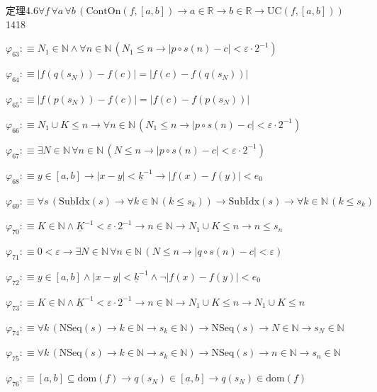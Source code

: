 \begin{fullproof}{定理4.6}{$\forall f\,\forall a\,\forall b\,(\mathrm{ContOn}(f,[a,b]) \to a \in \mathbb{R} \to b \in \mathbb{R} \to \mathrm{UC}(f,[a,b]))$}{1418}
\begin{abbrevlist}
\item $\varphi_{63} :\equiv N_{1} \in \mathbb{N} \land \forall n \in \mathbb{N}\,(N_{1} \leq n \to \lvert p \circ s(n) - c \rvert < \varepsilon \cdot 2^{-1})$
\item $\varphi_{64} :\equiv \lvert f(q(s_{N})) - f(c) \rvert = \lvert f(c) - f(q(s_{N})) \rvert$
\item $\varphi_{65} :\equiv \lvert f(p(s_{N})) - f(c) \rvert = \lvert f(c) - f(p(s_{N})) \rvert$
\item $\varphi_{66} :\equiv N_{1} \cup K \leq n \to \forall n \in \mathbb{N}\,(N_{1} \leq n \to \lvert p \circ s(n) - c \rvert < \varepsilon \cdot 2^{-1})$
\item $\varphi_{67} :\equiv \exists N \in \mathbb{N}\,\forall n \in \mathbb{N}\,(N \leq n \to \lvert p \circ s(n) - c \rvert < \varepsilon \cdot 2^{-1})$
\item $\varphi_{68} :\equiv y \in [a,b] \to \lvert x - y \rvert < \underline{k}^{-1} \to \lvert f(x) - f(y) \rvert < e_{0}$
\item $\varphi_{69} :\equiv \forall s\,(\mathrm{SubIdx}(s) \to \forall k \in \mathbb{N}\,(k \leq s_{k})) \to \mathrm{SubIdx}(s) \to \forall k \in \mathbb{N}\,(k \leq s_{k})$
\item $\varphi_{70} :\equiv K \in \mathbb{N} \land \underline{K}^{-1} < \varepsilon \cdot 2^{-1} \to n \in \mathbb{N} \to N_{1} \cup K \leq n \to n \leq s_{n}$
\item $\varphi_{71} :\equiv 0 < \varepsilon \to \exists N \in \mathbb{N}\,\forall n \in \mathbb{N}\,(N \leq n \to \lvert q \circ s(n) - c \rvert < \varepsilon)$
\item $\varphi_{72} :\equiv y \in [a,b] \land \lvert x - y \rvert < \underline{k}^{-1} \land \neg \lvert f(x) - f(y) \rvert < e_{0}$
\item $\varphi_{73} :\equiv K \in \mathbb{N} \land \underline{K}^{-1} < \varepsilon \cdot 2^{-1} \to n \in \mathbb{N} \to N_{1} \cup K \leq n \to N_{1} \cup K \leq n$
\item $\varphi_{74} :\equiv \forall k\,(\mathrm{NSeq}(s) \to k \in \mathbb{N} \to s_{k} \in \mathbb{N}) \to \mathrm{NSeq}(s) \to N \in \mathbb{N} \to s_{N} \in \mathbb{N}$
\item $\varphi_{75} :\equiv \forall k\,(\mathrm{NSeq}(s) \to k \in \mathbb{N} \to s_{k} \in \mathbb{N}) \to \mathrm{NSeq}(s) \to n \in \mathbb{N} \to s_{n} \in \mathbb{N}$
\item $\varphi_{76} :\equiv [a,b] \subseteq \mathrm{dom}(f) \to q(s_{N}) \in [a,b] \to q(s_{N}) \in \mathrm{dom}(f)$

\end{abbrevlist}
\end{fullproof}
